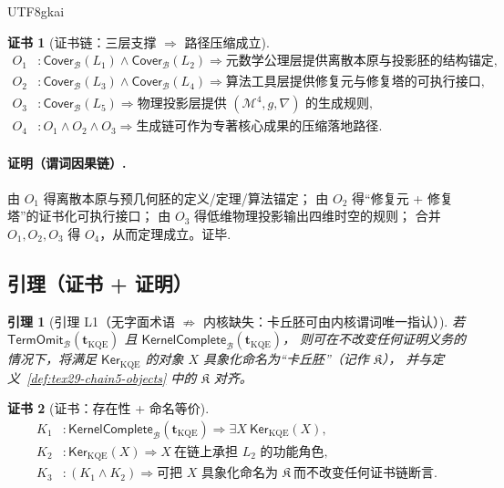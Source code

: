 \documentclass[12pt]{article}
\newtheorem{lemma}{引理}[section]
\newtheorem{Certificate}{证书}[section]
\begin{document}
\begin{CJK*}{UTF8}{gkai}
\begin{Certificate}[证书链：三层支撑 $\Rightarrow$ 路径压缩成立]
\label{cert:tex29-books-cover-chain-outline-detail}
\[
\begin{aligned}
  O_1 &: \mathsf{Cover}_{\mathcal{B}}(L_1)\wedge \mathsf{Cover}_{\mathcal{B}}(L_2)\Rightarrow
    \text{元数学公理层提供离散本原与投影胚的结构锚定},\\
  O_2 &: \mathsf{Cover}_{\mathcal{B}}(L_3)\wedge \mathsf{Cover}_{\mathcal{B}}(L_4)\Rightarrow \text{算法工具层提供修复元与修复塔的可执行接口}
    ,\\
  O_3 &: \mathsf{Cover}_{\mathcal{B}}(L_5)\Rightarrow \text{物理投影层提供 }(\mathcal{M}^4,g,\nabla)\text{ 的生成规则},\\
  O_4 &: O_1\wedge O_2\wedge O_3\Rightarrow \text{生成链可作为专著核心成果的压缩落地路径}.
\end{aligned}
\]
\end{Certificate}

\paragraph{证明（谓词因果链）.}
由 $O_1$ 得离散本原与预几何胚的定义/定理/算法锚定；
由 $O_2$ 得“修复元 + 修复塔”的证书化可执行接口；
由 $O_3$ 得低维物理投影输出四维时空的规则；
合并 $O_1,O_2,O_3$ 得 $O_4$，从而定理成立。证毕.

\subsection{引理（证书 + 证明）}
\label{subsec:tex29-books-cover-chain-lemma}

\begin{lemma}[引理 L1（无字面术语 $\not\Rightarrow$ 内核缺失：卡丘胚可由内核谓词唯一指认）]
\label{lem:tex29-books-kqemb-term-vs-kernel}
若 $\mathsf{TermOmit}_{\mathcal{B}}(\mathbf{t}_{\mathrm{KQE}})$ 且 $\mathsf{KernelComplete}_{\mathcal{B}}(\mathbf{t}
  _{\mathrm{KQE}})$，
则可在不改变任何证明义务的情况下，将满足 $\mathsf{Ker}_{\mathrm{KQE}}$ 的对象 $X$ 具象化命名为“卡丘胚”（记作 $\mathfrak{K}$），
并与定义~\ref{def:tex29-chain5-objects} 中的 $\mathfrak{K}$ 对齐。
\end{lemma}

\begin{Certificate}[证书：存在性 + 命名等价]
\label{cert:tex29-books-kqemb-term-vs-kernel}
\[
\begin{aligned}
  K_1 &: \mathsf{KernelComplete}_{\mathcal{B}}(\mathbf{t}_{\mathrm{KQE}})\Rightarrow \exists X\ \mathsf{Ker}
    _{\mathrm{KQE}}(X),\\
  K_2 &: \mathsf{Ker}_{\mathrm{KQE}}(X)\Rightarrow X\ \text{在链上承担 }L_2\text{ 的功能角色},\\
  K_3 &: (K_1\wedge K_2)\Rightarrow \text{可把 }X\text{ 具象化命名为 }\mathfrak{K}\ \text{而不改变任何证书链断言}.
\end{aligned}
\]
\end{Certificate}


\end{CJK*}
\end{document}
